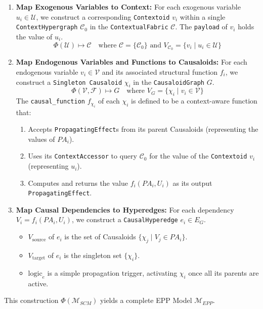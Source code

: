 \begin{enumerate}
    \item \textbf{Map Exogenous Variables to Context:} For each exogenous variable \(u_i \in \mathcal{U}\), we construct a corresponding \texttt{Contextoid} \(v_i\) within a single \texttt{ContextHypergraph} \(\mathcal{C}_0\) in the \texttt{ContextualFabric} \(\mathcal{C}\). The \texttt{payload} of \(v_i\) holds the value of \(u_i\).
    \[ \Phi(\mathcal{U}) \mapsto \mathcal{C} \quad \text{where } \mathcal{C} = \{\mathcal{C}_0\} \text{ and } V_{\mathcal{C}_0} = \{v_i \mid u_i \in \mathcal{U}\} \]

    \item \textbf{Map Endogenous Variables and Functions to Causaloids:} For each endogenous variable \(v_i \in \mathcal{V}\) and its associated structural function \(f_i\), we construct a \texttt{Singleton Causaloid} \(\chi_i\) in the \texttt{CausaloidGraph} \(G\).
    \[ \Phi(\mathcal{V}, \mathcal{F}) \mapsto G \quad \text{where } V_G = \{\chi_i \mid v_i \in \mathcal{V}\} \]
    The \texttt{causal\_function} \(f_{\chi_i}\) of each \(\chi_i\) is defined to be a context-aware function that:
    \begin{enumerate}
        \item Accepts \texttt{PropagatingEffect}s from its parent Causaloids (representing the values of \(PA_i\)).
        \item Uses its \texttt{ContextAccessor} to query \(\mathcal{C}_0\) for the value of the \texttt{Contextoid} \(v_i\) (representing \(u_i\)).
        \item Computes and returns the value \(f_i(PA_i, U_i)\) as its output \texttt{PropagatingEffect}.
    \end{enumerate}

    \item \textbf{Map Causal Dependencies to Hyperedges:} For each dependency \(V_i = f_i(PA_i, U_i)\), we construct a \texttt{CausalHyperedge} \(e_i \in E_G\).
    \begin{itemize}
        \item \(V_{\text{source}}\) of \(e_i\) is the set of Causaloids \(\{\chi_j \mid V_j \in PA_i\}\).
        \item \(V_{\text{target}}\) of \(e_i\) is the singleton set \(\{\chi_i\}\).
        \item \(\text{logic}_e\) is a simple propagation trigger, activating \(\chi_i\) once all its parents are active.
    \end{itemize}
\end{enumerate}
This construction \(\Phi(\mathcal{M}_{SCM})\) yields a complete EPP Model \(\mathcal{M}_{EPP}\).

